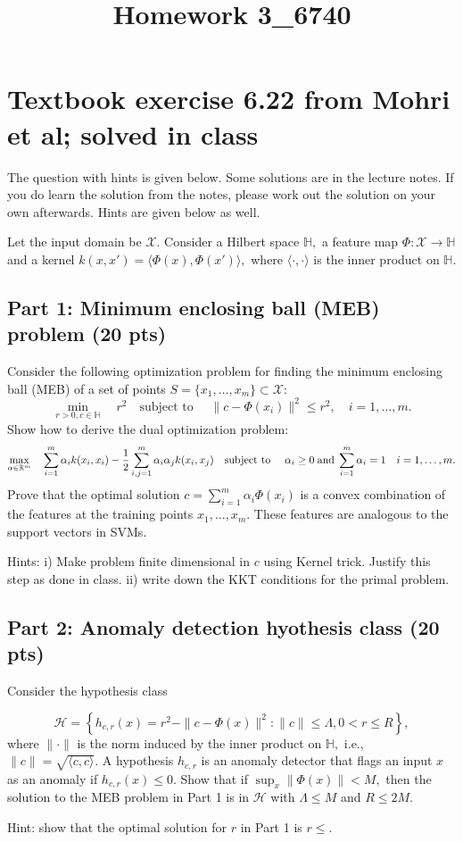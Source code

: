 \documentclass[12pt]{article}
\title{Homework 3_6740}
\begin{document}
\MakeScribeTop


\section*{Textbook exercise 6.22 from Mohri et al; solved in class}

The question with hints is given below. Some solutions are in the lecture notes. If you do learn the solution from the notes, please work out the solution on your own afterwards. Hints are given below as well.

Let the input domain be $\mathcal{X}$.
Consider a Hilbert space $\mathbb{H},$ a feature map $\Phi:\mathcal{X}\to\mathbb{H}$ and a kernel $k(x,x') = \langle \Phi(x), \Phi(x')\rangle,$ where $\langle \cdot, \cdot\rangle$ is the inner product on $\mathbb{H}.$
\subsection*{Part 1: Minimum enclosing ball (MEB) problem (20 pts)}

Consider the following optimization problem for finding the minimum enclosing ball (MEB) of a set of points $S = \{x_1,\ldots,x_m\}\subset\mathcal{X}$:
\begin{equation}
\min_{r>0,c\in\mathbb{H}} \quad r^2 \quad \text{subject to } \quad \|c-\Phi(x_i)\|^2\leq r^2, \quad i=1,\ldots,m.
\end{equation}
Show how to derive the dual optimization problem:
\begin{equation}
	\max_{\alpha\in\mathbb{R}^m} \quad \sum_{i=1}^m \alpha_i k(x_i, x_i) - \frac{1}{2}\sum_{i,j=1}^m \alpha_i\alpha_j k(x_i,x_j) \quad \text{subject to } \quad \alpha_i \geq 0 \;{\rm and}\; \sum_{i=1}^m \alpha_i = 1\quad i=1,\ldots,m.
\end{equation}
Prove that the optimal solution $c = \sum_{i=1}^m \alpha_i \Phi(x_i)$ is a convex combination of the features at the training points $x_1,\ldots,x_m.$ These features are analogous to the support vectors in SVMs.


Hints: i) Make problem finite dimensional in $c$ using Kernel trick. Justify this step as done in class. ii) write down the KKT conditions for the primal problem. 


\subsection*{Part 2: Anomaly detection hyothesis class (20 pts)}

Consider the hypothesis class 

\begin{equation}
	\mathcal{H} = \left\{h_{c,r}(x) = r^2 - \|c-\Phi(x)\|^2:\|c\|\leq \Lambda, 0 < r \leq R\right\},
\end{equation}
where $\|\cdot\|$ is the norm induced by the inner product on $\mathbb{H},$ i.e., $\|c\| = \sqrt{\langle c,c\rangle}.$ A hypothesis $h_{c,r}$ is an anomaly detector that flags an input $x$ as an anomaly if $h_{c,r}(x) \leq 0.$
Show that if $\sup_x \|\Phi(x)\| < M,$ then the solution to the MEB problem in Part 1 is in $\mathcal{H}$ with $\Lambda \leq M$ and $R \leq 2M.$

Hint: show that the optimal solution for $r$ in Part 1 is $r \leq  .$
\end{document}
